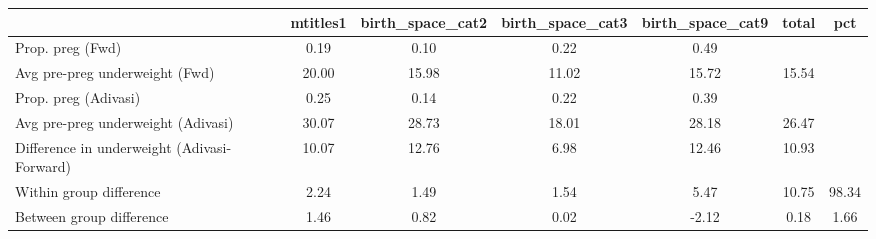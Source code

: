 \begin{tabular}{l*{6}{c}}
\toprule
            &\multicolumn{1}{c}{mtitles1}&\multicolumn{1}{c}{birth\_space\_cat2}&\multicolumn{1}{c}{birth\_space\_cat3}&\multicolumn{1}{c}{birth\_space\_cat9}&\multicolumn{1}{c}{total}&\multicolumn{1}{c}{pct}\\
\midrule
\midrule
Prop. preg (Fwd)&        0.19&        0.10&        0.22&        0.49&            &            \\
Avg pre-preg underweight (Fwd)&       20.00&       15.98&       11.02&       15.72&       15.54&            \\
Prop. preg (Adivasi)&        0.25&        0.14&        0.22&        0.39&            &            \\
Avg pre-preg underweight (Adivasi)&       30.07&       28.73&       18.01&       28.18&       26.47&            \\
Difference in underweight (Adivasi-Forward)&       10.07&       12.76&        6.98&       12.46&       10.93&            \\
Within group difference&        2.24&        1.49&        1.54&        5.47&       10.75&       98.34\\
Between group difference&        1.46&        0.82&        0.02&       -2.12&        0.18&        1.66\\
\bottomrule
\end{tabular}
